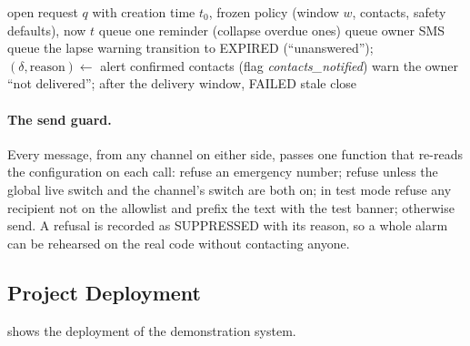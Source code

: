 \begin{algorithm}[htbp]
\caption{Assistance request sweeper (owner timeline and safety defaults)}
\label{alg:sweeper}
\small
\begin{algorithmic}[1]
\Require open request $q$ with creation time $t_0$, frozen policy (window $w$, contacts, safety defaults), now $t$
   queue one reminder (collapse overdue ones) \EndFor
   queue owner SMS \EndIf
   queue the lapse warning \EndIf
   transition to EXPIRED (``unanswered''); \Return \EndIf
\EndIf
\State $(\delta, \text{reason}) \gets$  
 alert confirmed contacts (flag \emph{contacts\_notified}) \EndIf
{} warn the owner ``not delivered''; after the delivery window, FAILED \EndIf
{} stale close \EndIf
\end{algorithmic}
\end{algorithm}

\paragraph{The send guard.} Every message, from any channel on either side, passes one function that re-reads the configuration on each call: refuse an emergency number; refuse unless the global live switch and the channel's switch are both on; in test mode refuse any recipient not on the allowlist and prefix the text with the test banner; otherwise send. A refusal is recorded as SUPPRESSED with its reason, so a whole alarm can be rehearsed on the real code without contacting anyone.

\subsection{Project Deployment}
\label{sec:deployment}

 shows the deployment of the demonstration system.

